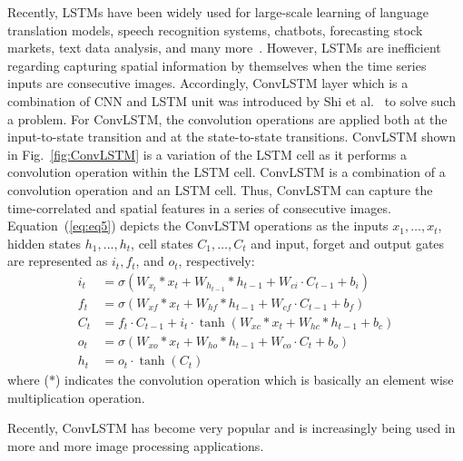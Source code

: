 Recently, LSTMs have been widely used for large-scale learning of language translation models, speech recognition systems, chatbots, forecasting stock markets, text data analysis, and many more~\cite{graves2014towards, cho2014properties}. 
However, LSTMs are inefficient regarding capturing spatial information by themselves when the time series inputs are consecutive images.
Accordingly, ConvLSTM layer which is a combination of CNN and LSTM unit was introduced by Shi et al.~\cite{xingjian2015convolutional} to solve such a problem.
For ConvLSTM, the convolution operations are applied both at the input-to-state transition and at the state-to-state transitions.  
ConvLSTM shown in Fig.~\ref{fig:ConvLSTM} is a variation of the LSTM cell as it performs a convolution operation within the LSTM cell.
ConvLSTM is a combination of a convolution operation and an LSTM cell.
Thus, ConvLSTM can capture the time-correlated and spatial features in a series of consecutive images. 
Equation~(\ref{eq:eq5}) depicts the ConvLSTM operations as the inputs \(x_1, \dots, x_t\), hidden states \(h_1, \dots, h_t\), cell states \(C_1, \dots, C_t\) and input, forget and output gates are represented as \(i_t, f_t\), and \(o_t\), respectively:
\begin{equation}
	\begin{aligned}
		i_{t} &=\sigma\left(W_{x_t} * x_{t}+W_{h_{t-1}} * h_{t-1}+W_{c i} \cdot C_{t-1}+b_{i}\right) 
		\\
		f_{t} &=\sigma\left(W_{x f} * x_{t}+W_{h f} * h_{t-1}+W_{c f} \cdot C_{t-1}+b_{f}\right) \\
		C_{t} &=f_{t} \cdot C_{t-1}+i_{t} \cdot \tanh \left(W_{x c} * x_{t}+W_{h c} * h_{t-1}+b_{c}\right) 
		\\
		o_{t} &=\sigma\left(W_{x o} * x_{t}+W_{h o} * h_{t-1}+W_{c o} \cdot C_{t}+b_{o}\right) \\
		h_{t} &=o_{t} \cdot \tanh \left(C_{t}\right)
	\end{aligned}
	\label{eq:eq5}
\end{equation}
where (\(*\)) indicates the convolution operation which is basically an element wise multiplication operation.

Recently, ConvLSTM has become very popular and is increasingly being used in 
more and more image processing applications.